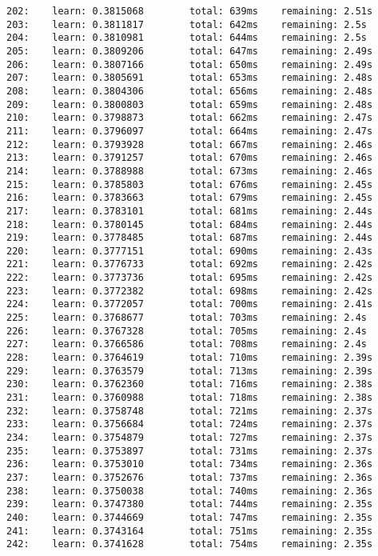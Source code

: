 \documentclass[11pt]{article}
\begin{document}
\begin{Verbatim}[commandchars=\\\{\}]
202:    learn: 0.3815068        total: 639ms    remaining: 2.51s
203:    learn: 0.3811817        total: 642ms    remaining: 2.5s
204:    learn: 0.3810981        total: 644ms    remaining: 2.5s
205:    learn: 0.3809206        total: 647ms    remaining: 2.49s
206:    learn: 0.3807166        total: 650ms    remaining: 2.49s
207:    learn: 0.3805691        total: 653ms    remaining: 2.48s
208:    learn: 0.3804306        total: 656ms    remaining: 2.48s
209:    learn: 0.3800803        total: 659ms    remaining: 2.48s
210:    learn: 0.3798873        total: 662ms    remaining: 2.47s
211:    learn: 0.3796097        total: 664ms    remaining: 2.47s
212:    learn: 0.3793928        total: 667ms    remaining: 2.46s
213:    learn: 0.3791257        total: 670ms    remaining: 2.46s
214:    learn: 0.3788988        total: 673ms    remaining: 2.46s
215:    learn: 0.3785803        total: 676ms    remaining: 2.45s
216:    learn: 0.3783663        total: 679ms    remaining: 2.45s
217:    learn: 0.3783101        total: 681ms    remaining: 2.44s
218:    learn: 0.3780145        total: 684ms    remaining: 2.44s
219:    learn: 0.3778485        total: 687ms    remaining: 2.44s
220:    learn: 0.3777151        total: 690ms    remaining: 2.43s
221:    learn: 0.3776733        total: 692ms    remaining: 2.42s
222:    learn: 0.3773736        total: 695ms    remaining: 2.42s
223:    learn: 0.3772382        total: 698ms    remaining: 2.42s
224:    learn: 0.3772057        total: 700ms    remaining: 2.41s
225:    learn: 0.3768677        total: 703ms    remaining: 2.4s
226:    learn: 0.3767328        total: 705ms    remaining: 2.4s
227:    learn: 0.3766586        total: 708ms    remaining: 2.4s
228:    learn: 0.3764619        total: 710ms    remaining: 2.39s
229:    learn: 0.3763579        total: 713ms    remaining: 2.39s
230:    learn: 0.3762360        total: 716ms    remaining: 2.38s
231:    learn: 0.3760988        total: 718ms    remaining: 2.38s
232:    learn: 0.3758748        total: 721ms    remaining: 2.37s
233:    learn: 0.3756684        total: 724ms    remaining: 2.37s
234:    learn: 0.3754879        total: 727ms    remaining: 2.37s
235:    learn: 0.3753897        total: 731ms    remaining: 2.37s
236:    learn: 0.3753010        total: 734ms    remaining: 2.36s
237:    learn: 0.3752676        total: 737ms    remaining: 2.36s
238:    learn: 0.3750038        total: 740ms    remaining: 2.36s
239:    learn: 0.3747380        total: 744ms    remaining: 2.35s
240:    learn: 0.3744669        total: 747ms    remaining: 2.35s
241:    learn: 0.3743164        total: 751ms    remaining: 2.35s
242:    learn: 0.3741628        total: 754ms    remaining: 2.35s

\end{Verbatim}
\end{document}
